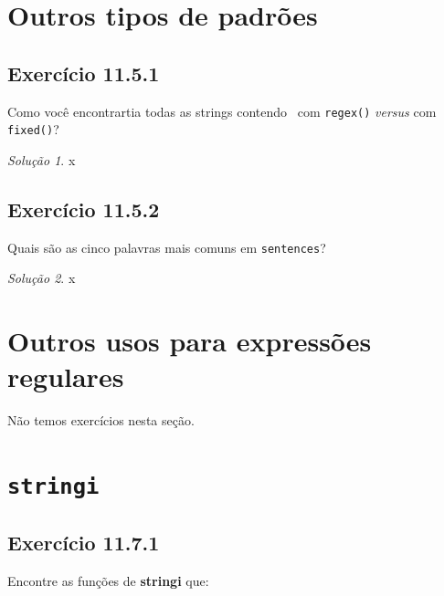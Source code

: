 \documentclass[
]{latex/krantz}
\theoremstyle{definition}
\theoremstyle{definition}
\theoremstyle{definition}
\theoremstyle{definition}
\theoremstyle{remark}
\newtheorem*{solution}{Solução}
\begin{document}
\hypertarget{outros-tipos-de-padruxf5es}{%
\section{Outros tipos de padrões}\label{outros-tipos-de-padruxf5es}}

\hypertarget{exr11-5-1}{%
\subsection*{Exercício 11.5.1}\label{exr11-5-1}}

Como você encontrartia todas as strings contendo ~com \texttt{regex()} \emph{versus} com \texttt{fixed()}?

\begin{solution}
x
\end{solution}

\hypertarget{exr11-5-2}{%
\subsection*{Exercício 11.5.2}\label{exr11-5-2}}

Quais são as cinco palavras mais comuns em \texttt{sentences}?

\begin{solution}
x
\end{solution}

\hypertarget{outros-usos-para-expressuxf5es-regulares}{%
\section{Outros usos para expressões regulares}\label{outros-usos-para-expressuxf5es-regulares}}

Não temos exercícios nesta seção.

\hypertarget{stringi}{%
\section{\texorpdfstring{\texttt{stringi}}{stringi}}\label{stringi}}

\hypertarget{exr11-7-1}{%
\subsection*{Exercício 11.7.1}\label{exr11-7-1}}

Encontre as funções de \textbf{stringi} que:
\end{document}
